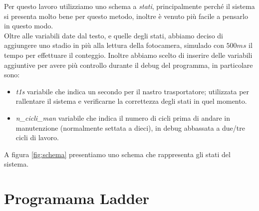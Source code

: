 \documentclass{article}
\begin{document}
Per questo lavoro utilizziamo uno schema a \textit{stati}, principalmente perché il sistema si presenta molto bene per questo metodo, inoltre è venuto più facile a pensarlo in questo modo.
\\

Oltre alle variabili date dal testo, e quelle degli stati, abbiamo deciso di aggiungere uno stadio in più alla lettura della fotocamera, simulado con $500ms$ il tempo per effettuare il conteggio.
Inoltre abbiamo scelto di inserire delle variabili aggiuntive per avere più controllo durante il debug del programma, in particolare sono:
\begin{itemize}
    \item \textit{t1s} variabile che indica un secondo per il nastro trasportatore; utilizzata per rallentare il sistema e verificarne la correttezza degli stati in quel momento.
    \item \textit{n\_cicli\_man} variabile che indica il numero di cicli prima di andare in manutenzione (normalmente settata a dieci), in debug abbassata a due/tre cicli di lavoro.
\end{itemize}

A figura \ref*{fig:schema} presentiamo uno schema che rappresenta gli stati del sistema.

\section{Programama Ladder}

\end{document}
